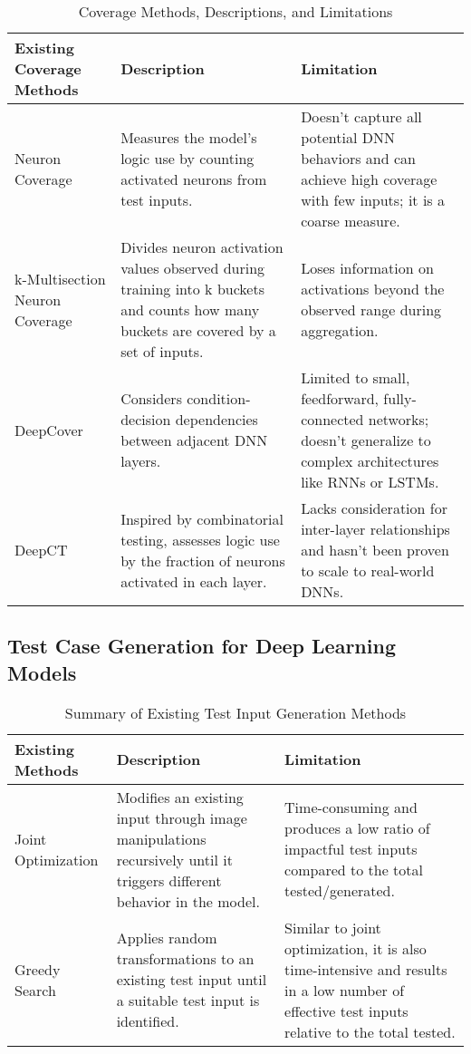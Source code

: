 \begin{table}[h]
    \centering
    \begin{tabular}{|p{4cm}|p{5cm}|p{5cm}|}
    \hline
    \textbf{Existing Coverage Methods} & \textbf{Description} & \textbf{Limitation} \\
    \hline
    Neuron Coverage & Measures the model's logic use by counting activated neurons from test inputs. & Doesn't capture all potential DNN behaviors and can achieve high coverage with few inputs; it is a coarse measure. \\
    \hline
    k-Multisection Neuron Coverage & Divides neuron activation values observed during training into k buckets and counts how many buckets are covered by a set of inputs. & Loses information on activations beyond the observed range during aggregation. \\
    \hline
    DeepCover & Considers condition-decision dependencies between adjacent DNN layers. & Limited to small, feedforward, fully-connected networks; doesn't generalize to complex architectures like RNNs or LSTMs. \\
    \hline
    DeepCT & Inspired by combinatorial testing, assesses logic use by the fraction of neurons activated in each layer. & Lacks consideration for inter-layer relationships and hasn't been proven to scale to real-world DNNs. \\
    \hline
    \end{tabular}
    \caption{Coverage Methods, Descriptions, and Limitations}
    \label{table:coverage_methods}
    \end{table}

\subsection{Test Case Generation for Deep Learning Models}

    


\begin{table}[h]
    \centering
    \begin{tabular}{|p{3.5cm}|p{5.5cm}|p{5.5cm}|}
    \hline
    \textbf{Existing Methods} & \textbf{Description} & \textbf{Limitation} \\
    \hline
    Joint Optimization & Modifies an existing input through image manipulations recursively until it triggers different behavior in the model. & Time-consuming and produces a low ratio of impactful test inputs compared to the total tested/generated. \\
    \hline
    Greedy Search & Applies random transformations to an existing test input until a suitable test input is identified. & Similar to joint optimization, it is also time-intensive and results in a low number of effective test inputs relative to the total tested. \\
    \hline
    \end{tabular}
    \caption{Summary of Existing Test Input Generation Methods}
    \label{table:test_input_generation_methods}
    \end{table}
    
